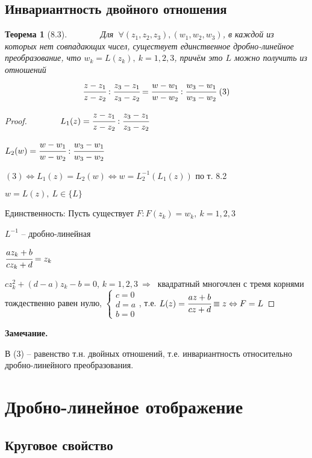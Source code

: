 \documentclass[draft]{article}
\newcommand{\forcenewline}{$\phantom{\mbox{newline}}$\newline}
\newcommand{\then}{\ \Rightarrow\ }
\newcommand{\LRA}{\Leftrightarrow}
\newcommand{\F}{\ \forall}
\newcommand{\sys}[1]{\left\{\begin{matrix}#1\end{matrix}\right.}
\newtheorem*{theor}{Теорема}
\theoremstyle{remark}
\begin{document}
\subsection{Инвариантность двойного отношения}
\begin{theor}[8.3]
\forcenewline
Для $\F(z_1,z_2,z_3),(w_1,w_2,w_3)$, в каждой из которых нет совпадающих чисел, существует единственное дробно-линейное преобразование, что $w_k=L(z_k),\ k=1,2,3$, причём это $L$ можно получить из отношений
$$
\cfrac{z-z_1}{z-z_2}:\cfrac{z_3-z_1}{z_3-z_2}=\cfrac{w-w_1}{w-w_2}:\cfrac{w_3-w_1}{w_3-w_2}\ (3)
$$
\end{theor}

\begin{proof}
\forcenewline
$L_1(z)=\cfrac{z-z_1}{z-z_2}:\cfrac{z_3-z_1}{z_3-z_2}$

$L_2(w)=\cfrac{w-w_1}{w-w_2}:\cfrac{w_3-w_1}{w_3-w_2}$

$(3) \LRA L_1(z)=L_2(w) \LRA w=L^{-1}_2(L_1(z))$ по т. 8.2

$w=L(z),\ L\in\{L\}$

Единственность: Пусть существует $F\colon F(z_k)=w_k,\ k=1,2,3$

$L^{-1}$ -- дробно-линейная

$\cfrac{az_k+b}{cz_k+d}=z_k$

$cz_k^2+(d-a)z_k-b=0$, $k=1,2,3 \then $ квадратный многочлен с тремя корнями тождественно равен нулю, $\sys{c=0 \\ d=a \\ b=0}$, т.е. $L(z)=\cfrac{az+b}{cz+d}\equiv z \LRA F=L$
\end{proof}

{\bfseries Замечание.}

В (3) -- равенство т.н. двойных отношений, т.е. инвариантность относительно дробно-линейного преобразования.

\newpage

\section{Дробно-линейное отображение}

\subsection{Круговое свойство}
\end{document}
